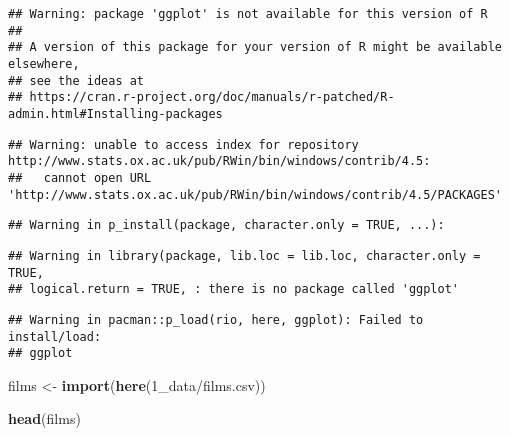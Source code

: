 \documentclass[
]{article}
\newenvironment{Shaded}{\begin{snugshade}}{\end{snugshade}}
\newcommand{\FunctionTok}[1]{\textcolor[rgb]{0.13,0.29,0.53}{\textbf{#1}}}
\newcommand{\NormalTok}[1]{#1}
\newcommand{\OtherTok}[1]{\textcolor[rgb]{0.56,0.35,0.01}{#1}}
\newcommand{\StringTok}[1]{\textcolor[rgb]{0.31,0.60,0.02}{#1}}
\begin{document}
\begin{verbatim}
## Warning: package 'ggplot' is not available for this version of R
## 
## A version of this package for your version of R might be available elsewhere,
## see the ideas at
## https://cran.r-project.org/doc/manuals/r-patched/R-admin.html#Installing-packages
\end{verbatim}

\begin{verbatim}
## Warning: unable to access index for repository http://www.stats.ox.ac.uk/pub/RWin/bin/windows/contrib/4.5:
##   cannot open URL 'http://www.stats.ox.ac.uk/pub/RWin/bin/windows/contrib/4.5/PACKAGES'
\end{verbatim}

\begin{verbatim}
## Warning in p_install(package, character.only = TRUE, ...):
\end{verbatim}

\begin{verbatim}
## Warning in library(package, lib.loc = lib.loc, character.only = TRUE,
## logical.return = TRUE, : there is no package called 'ggplot'
\end{verbatim}

\begin{verbatim}
## Warning in pacman::p_load(rio, here, ggplot): Failed to install/load:
## ggplot
\end{verbatim}

\begin{Shaded}
\begin{Highlighting}[]
\NormalTok{films }\OtherTok{\textless{}{-}} \FunctionTok{import}\NormalTok{(}\FunctionTok{here}\NormalTok{(}\StringTok{\textquotesingle{}1\_data/films.csv\textquotesingle{}}\NormalTok{)) }

\FunctionTok{head}\NormalTok{(films)}
\end{Highlighting}
\end{Shaded}
\end{document}
